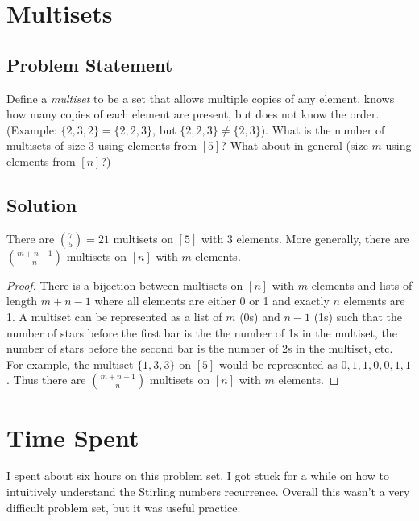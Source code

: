 \documentclass[12pt]{article}
\begin{document}
\section{Multisets}
\subsection*{Problem Statement}
Define a \emph{multiset} to be a set that allows multiple copies of any element, knows how many copies of each element are present, but does not know the order. (Example:  $\{2,3,2\} = \{2,2,3\}$, but $\{2,2,3\} \neq \{2,3\}$). What is the number of multisets of size 3 using elements from $[5]$? What about in general (size $m$ using elements from $[n]$?)
\subsection*{Solution}

There are $\binom{7}{5} = 21$ multisets on $[5]$ with 3 elements. More generally, there are $\binom{m+n-1}{n}$ multisets on $[n]$ with $m$ elements. 
\begin{proof}
    There is a bijection between multisets on $[n]$ with $m$ elements and lists of length $m+n-1$ where all elements are either 0 or 1 and exactly $n$ elements are 1. A multiset can be represented as a list of $m$  (0s) and $n-1$  (1s) such that the number of stars before the first bar is the the number of 1s in the multiset, the number of stars before the second bar is the number of 2s in the multiset, etc. For example, the multiset $\{1,3,3\}$ on $[5]$ would be represented as $0,1,1,0,0,1,1$. Thus there are $\binom{m+n-1}{n}$ multisets on $[n]$ with $m$ elements. 
\end{proof}

\section{Time Spent}

I spent about six hours on this problem set. I got stuck for a while on how to intuitively understand the Stirling numbers recurrence. Overall this wasn't a very difficult problem set, but it was useful practice.
\end{document}
